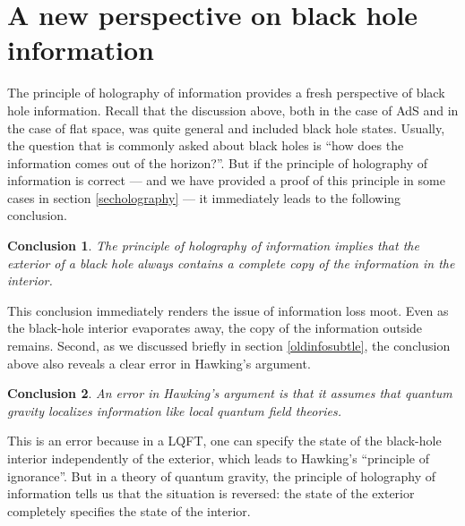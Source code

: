\documentclass[12pt]{article}
\newtheorem{lesson}{Conclusion}
\begin{document}
\section{A new perspective on black hole information \label{secresolveinfo}}
The principle of holography of information provides a fresh perspective of black hole information. Recall that the discussion above, both in the case of AdS and in the case of flat space, was
quite general and included black hole states. Usually, the question that is commonly asked about black holes is  ``how does the information comes out of the horizon?''. But if the principle of holography of information is correct --- and we have provided a proof of this principle in some cases in section \ref{secholography} --- it immediately leads to the following conclusion.
\begin{lesson}
\label{lessonalwaysoutside}
The principle of holography of information  implies that the exterior of a black hole always contains a complete copy of the information in the interior. 
\end{lesson}
This conclusion  immediately renders the issue of information loss moot. Even as the black-hole interior evaporates away, the copy of the information outside remains.  Second, as we discussed briefly in section \ref{oldinfosubtle}, the conclusion above also reveals a clear error in Hawking's argument.
\begin{lesson}
\label{lessonhawkerror}
An error in Hawking's argument is that it assumes that quantum gravity localizes information like local quantum field theories.
\end{lesson}
This is an error because in a LQFT, one can specify the state of the black-hole interior independently of the exterior, which leads to Hawking's ``principle of ignorance''. But in a theory of quantum gravity, the principle of holography of information tells us that the situation is reversed: the state of the exterior completely specifies the state of the interior. 
\end{document}
